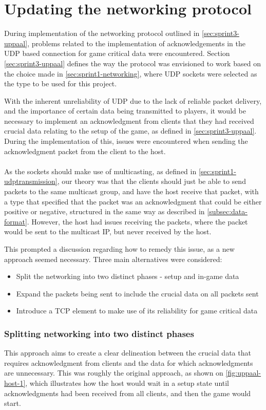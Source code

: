 \section{Updating the networking protocol}\label{sec:update-network-protocol}
During implementation of the networking protocol outlined in \autoref{sec:sprint3-uppaal}, problems related to the implementation of acknowledgements in the UDP based connection for game critical data were encountered.
Section \ref{sec:sprint3-uppaal} defines the way the protocol was envisioned to work based on the choice made in \autoref{sec:sprint1-networking}, where UDP sockets were selected as the type to be used for this project.

With the inherent unreliability of UDP due to the lack of reliable packet delivery, and the importance of certain data being transmitted to players, it would be necessary to implement an acknowledgment from clients that they had received crucial data relating to the setup of the game, as defined in \autoref{sec:sprint3-uppaal}.
During the implementation of this, issues were encountered when sending the acknowledgment packet from the client to the host.
\\\\
As the sockets should make use of multicasting, as defined in \autoref{sec:sprint1-udptransmission}, our theory was that the clients should just be able to send packets to the same multicast group, and have the host receive that packet, with a type that specified that the packet was an acknowledgment that could be either positive or negative, structured in the same way as described in \autoref{subsec:data-format}.
However, the host had issues receiving the packets, where the packet would be sent to the multicast IP, but never received by the host.

This prompted a discussion regarding how to remedy this issue, as a new approach seemed necessary.
Three main alternatives were considered:
\begin{itemize}
    \item Split the networking into two distinct phases - setup and in-game data
    \item Expand the packets being sent to include the crucial data on all packets sent
    \item Introduce a TCP element to make use of its reliability for game critical data
\end{itemize}

\subsubsection{Splitting networking into two distinct phases}
This approach aims to create a clear delineation between the crucial data that requires acknowledgment from clients and the data for which acknowledgments are unnecessary.
This was roughly the original approach, as shown on \autoref{fig:uppaal-host-1}, which illustrates how the host would wait in a setup state until acknowledgments had been received from all clients, and then the game would start.

